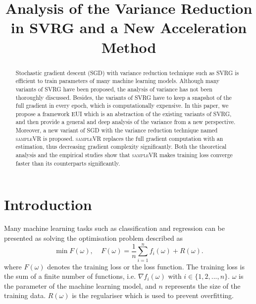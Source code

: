 \documentclass[letterpaper]{article}
\begin{document}
%
\title{Analysis of the Variance Reduction in SVRG and a New Acceleration Method}
\maketitle
\begin{abstract}
Stochastic gradient descent (SGD) with variance reduction  technique such as SVRG is efficient to train parameters of many machine learning models. Although many variants of SVRG have been proposed,  the analysis of variance has not been thoroughly discussed. Besides,  the variants of SVRG have to keep a snapshot of the full gradient in every epoch, which is computationally expensive. In this paper, we propose a framework EUI which is an abstraction of  the existing variants of SVRG, and then  provide a general and deep analysis of the variance from a new perspective. Moreover,   a new variant of SGD with the variance reduction technique named \textsc{sampleVR} is proposed. \textsc{sampleVR} replaces the full gradient computation with an estimation, thus decreasing gradient complexity significantly.  Both the theoretical analysis and the empirical studies show that \textsc{sampleVR} makes  training loss converge faster than its counterparts significantly. 
\end{abstract}

\section{Introduction}
\label{sect_introduction}
Many machine learning tasks such as classification and regression  can be  presented as solving the optimisation problem described as 
\begin{equation}
\label{equa_loss_minimization}
\min F(\omega),~~~~~F(\omega)=\frac{1}{n}\sum\limits_{i=1}^n f_i(\omega)+R(\omega).
\end{equation} where $F(\omega)$ denotes the training loss or the loss function. The training loss is the sum of a finite number of functions, i.e. $\nabla f_i(\omega)$ with $i\in\{1,2, ..., n\}$. $\omega$ is the parameter of the machine learning model, and $n$ represents the size of the training data. $R(\omega)$ is the regulariser  which is used to prevent overfitting.    
\end{document}
